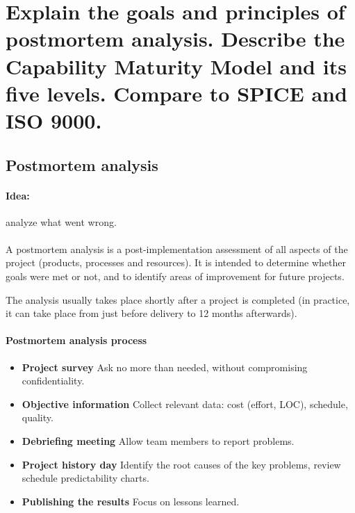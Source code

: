 \clearpage{}
\section{Explain the goals and principles of postmortem analysis. Describe
the Capability Maturity Model and its five levels. Compare to SPICE and ISO
9000.}

\subsection{Postmortem analysis}

\paragraph{Idea:} analyze what went wrong.

\paragraph{}
A postmortem analysis is a post-implementation assessment of all aspects of the
project (products, processes and resources). It is intended to determine whether
goals were met or not, and to identify areas of improvement for future projects.\newline

The analysis usually takes place shortly after a project is completed (in
practice, it can take place from just before delivery to 12 months afterwards).

\paragraph{Postmortem analysis process}

\begin{itemize}
    \item \textbf{Project survey}
        \subitem{} Ask no more than needed, without compromising confidentiality.
    \item \textbf{Objective information}
        \subitem{} Collect relevant data: cost (effort, LOC), schedule, quality.
    \item \textbf{Debriefing meeting}
        \subitem{} Allow team members to report problems.
    \item \textbf{Project history day}
        \subitem{} Identify the root causes of the key problems, review schedule predictability charts.
    \item \textbf{Publishing the results}
        \subitem{} Focus on lessons learned.
\end{itemize}

